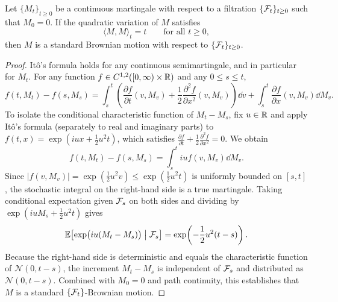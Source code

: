 \begin{lemma}\label{lem:levy-theorem}
    Let $\{M_t\}_{t \geq 0}$ be a continuous martingale with respect to a filtration $\{\mathcal{F}_t\}_{t \geq 0}$ such that $M_0 = 0$. If the quadratic variation of $M$ satisfies
    \[
    \langle M, M \rangle_t = t \qquad \text{for all } t \geq 0,
    \]
    then $M$ is a standard Brownian motion with respect to $\{\mathcal{F}_t\}_{t \geq 0}$.
\end{lemma}
\begin{proof}
    It\^o's formula holds for any continuous semimartingale, and in particular for $M_t$. For any function $f \in C^{1,2}([0,\infty) \times \mathbb{R})$ and any $0 \leq s \leq t$,
    \[
    f(t, M_t) - f(s, M_s) = \int_s^t \left(\frac{\partial f}{\partial t}(v, M_v) + \frac{1}{2}\frac{\partial^2 f}{\partial x^2}(v, M_v)\right)\dd v + \int_s^t \frac{\partial f}{\partial x}(v, M_v)\dd M_v.
    \]
    To isolate the conditional characteristic function of $M_t - M_s$, fix $u \in \mathbb{R}$ and apply It\^o's formula (separately to real and imaginary parts) to $f(t, x) = \exp(i u x + \frac{1}{2} u^2 t)$, which satisfies $\frac{\partial f}{\partial t} + \frac{1}{2}\frac{\partial^2 f}{\partial x^2} = 0$. We obtain
    \[
    f(t, M_t) - f(s, M_s) = \int_s^t i u f(v, M_v)\dd M_v.
    \]
    Since $|f(v, M_v)| = \exp(\frac{1}{2}u^2 v) \leq \exp(\frac{1}{2}u^2 t)$ is uniformly bounded on $[s, t]$, the stochastic integral on the right-hand side is a true martingale. Taking conditional expectation given $\mathcal{F}_s$ on both sides and dividing by $\exp(i u M_s + \frac{1}{2} u^2 t)$ gives
    \[
    \mathbb{E}\!\left[\exp\bigl(i u (M_t - M_s)\bigr) \;\middle|\; \mathcal{F}_s\right] = \exp\!\left(-\frac{1}{2} u^2 (t - s)\right).
    \]
    Because the right-hand side is deterministic and equals the characteristic function of $\mathcal{N}(0, t - s)$, the increment $M_t - M_s$ is independent of $\mathcal{F}_s$ and distributed as $\mathcal{N}(0, t - s)$. Combined with $M_0 = 0$ and path continuity, this establishes that $M$ is a standard $\{\mathcal{F}_t\}$-Brownian motion.
\end{proof}

